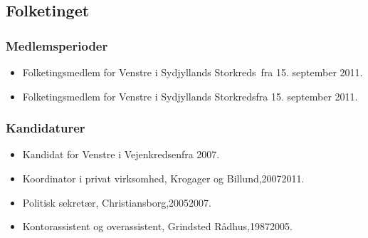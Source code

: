 \documentclass[11pt, a4paper]{awesome-cv}
\begin{document}
\begin{cvletter}
\subsection*{Folketinget}
\subsubsection*{Medlemsperioder}
\begin{itemize}
\item Folketingsmedlem for Venstre i Sydjyllands Storkreds fra 15. september 2011.
\item Folketingsmedlem for Venstre i Sydjyllands Storkredsfra 15. september 2011.
\end{itemize}
\subsubsection*{Kandidaturer}
\begin{itemize}
\item Kandidat for Venstre i Vejenkredsenfra 2007.
\end{itemize}
\begin{itemize}
\item Koordinator i privat virksomhed, Krogager og Billund,20072011.
\item Politisk sekretær, Christiansborg,20052007.
\item Kontorassistent og overassistent, Grindsted Rådhus,19872005.
\end{itemize}
\end{cvletter}
\end{document}
